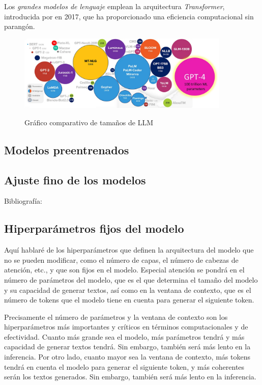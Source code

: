 Los \textit{grandes modelos de lenguaje} emplean la arquitectura \textit{Transformer}, introducida por \citeauthor{vaswaniAttentionAllYou2017} en 2017, que ha proporcionado una eficiencia computacional sin parangón.

\begin{figure}[h]
    \caption{Gráfico comparativo de tamaños de LLM}
    \centering
    \includegraphics[width=0.9\textwidth]{./figuras/LLMs_sizes.png}
    \label{fig:llm_sizes}
\end{figure}

\subsection{Modelos preentrenados}
\subsection{Ajuste fino de los modelos}
Bibliografía: \cite{chamandFinetuneYourClassifier2022}

\subsection{Hiperparámetros fijos del modelo}
Aquí hablaré de los hiperparámetros que definen la arquitectura del modelo que no se pueden modificar, como el número de capas, el número de cabezas de atención, etc., y que son fijos en el modelo. Especial atención se pondrá en el número de parámetros del modelo, que es el que determina el tamaño del modelo y su capacidad de generar textos, así como en la ventana de contexto, que es el número de tokens que el modelo tiene en cuenta para generar el siguiente token.

Precisamente el número de parámetros y la ventana de contexto son los hiperparámetros más importantes y críticos en términos computacionales y de efectividad. Cuanto más grande sea el modelo, más parámetros tendrá y más capacidad de generar textos tendrá. Sin embargo, también será más lento en la inferencia. Por otro lado, cuanto mayor sea la ventana de contexto, más tokens tendrá en cuenta el modelo para generar el siguiente token, y más coherentes serán los textos generados. Sin embargo, también será más lento en la inferencia.

